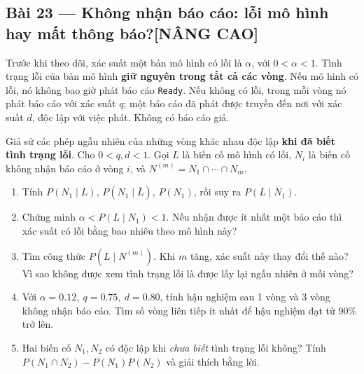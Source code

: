 \documentclass[11pt,a4paper]{article}
\newcommand{\advanced}{\texorpdfstring{\hfill{\normalsize\sffamily\color{Warm}[NÂNG CAO]}}{ [Nâng cao]}}
\begin{document}
\noindent\begin{minipage}{\linewidth}
\subsection*{Bài 23 --- Không nhận báo cáo: lỗi mô hình hay mất thông báo?\advanced}

Trước khi theo dõi, xác suất một bản mô hình có lỗi là \(\alpha\), với \(0<\alpha<1\). Tình trạng lỗi của bản mô hình \textbf{giữ nguyên trong tất cả các vòng}. Nếu mô hình có lỗi, nó không bao giờ phát báo cáo \texttt{Ready}. Nếu không có lỗi, trong mỗi vòng nó phát báo cáo với xác suất \(q\); một báo cáo đã phát được truyền đến nơi với xác suất \(d\), độc lập với việc phát. Không có báo cáo giả.

Giả sử các phép ngẫu nhiên của những vòng khác nhau độc lập \textbf{khi đã biết tình trạng lỗi}. Cho \(0<q,d<1\). Gọi \(L\) là biến cố mô hình có lỗi, \(N_i\) là biến cố không nhận báo cáo ở vòng \(i\), và \(N^{(m)}=N_1\cap\cdots\cap N_m\).

\begin{enumerate}[label=\alph*)]
\item Tính \(P(N_1\mid L)\), \(P(N_1\mid\overline L)\), \(P(N_1)\), rồi suy ra \(P(L\mid N_1)\).
\item Chứng minh \(\alpha<P(L\mid N_1)<1\). Nếu nhận được ít nhất một báo cáo thì xác suất có lỗi bằng bao nhiêu theo mô hình này?
\item Tìm công thức \(P(L\mid N^{(m)})\). Khi \(m\) tăng, xác suất này thay đổi thế nào? Vì sao không được xem tình trạng lỗi là được lấy lại ngẫu nhiên ở mỗi vòng?
\item Với \(\alpha=0.12,\ q=0.75,\ d=0.80\), tính hậu nghiệm sau 1 vòng và 3 vòng không nhận báo cáo. Tìm số vòng liên tiếp ít nhất để hậu nghiệm đạt từ \(90\%\) trở lên.
\item Hai biến cố \(N_1,N_2\) có độc lập khi \emph{chưa biết} tình trạng lỗi không? Tính \(P(N_1\cap N_2)-P(N_1)P(N_2)\) và giải thích bằng lời.
\end{enumerate}

\end{minipage}\par

\par\medskip
\end{document}
